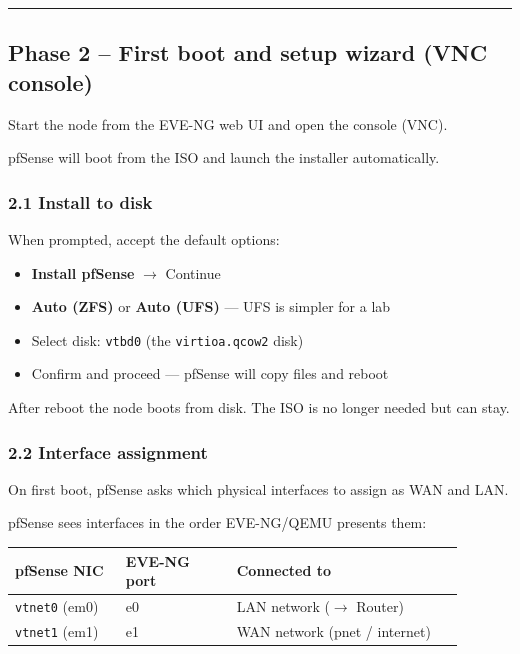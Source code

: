 \begin{center}\rule{0.5\linewidth}{0.5pt}\end{center}

\subsection{Phase 2 -- First boot and setup wizard (VNC console)}

Start the node from the EVE-NG web UI and open the console (VNC).

pfSense will boot from the ISO and launch the installer automatically.

\subsubsection{2.1 Install to disk}

When prompted, accept the default options:

\begin{itemize}
\tightlist
\item
  \textbf{Install pfSense} $\rightarrow$ Continue
\item
  \textbf{Auto (ZFS)} or \textbf{Auto (UFS)} --- UFS is simpler for a lab
\item
  Select disk: \texttt{vtbd0} (the \texttt{virtioa.qcow2} disk)
\item
  Confirm and proceed --- pfSense will copy files and reboot
\end{itemize}

After reboot the node boots from disk. The ISO is no longer needed but can stay.

\subsubsection{2.2 Interface assignment}

On first boot, pfSense asks which physical interfaces to assign as WAN and LAN.

pfSense sees interfaces in the order EVE-NG/QEMU presents them:

{\footnotesize\begin{longtable}[]{@{}
  >{\raggedright\arraybackslash}p{0.22\linewidth}
  >{\raggedright\arraybackslash}p{0.22\linewidth}
  >{\raggedright\arraybackslash}p{0.45\linewidth}@{}}
\toprule\noalign{}
\textbf{pfSense NIC} & \textbf{EVE-NG port} & \textbf{Connected to} \\
\midrule\noalign{}
\endhead
\bottomrule\noalign{}
\endlastfoot
\texttt{vtnet0} (em0) & e0 & LAN network ($\rightarrow$ Router) \\
\texttt{vtnet1} (em1) & e1 & WAN network (pnet / internet) \\
\end{longtable}}

